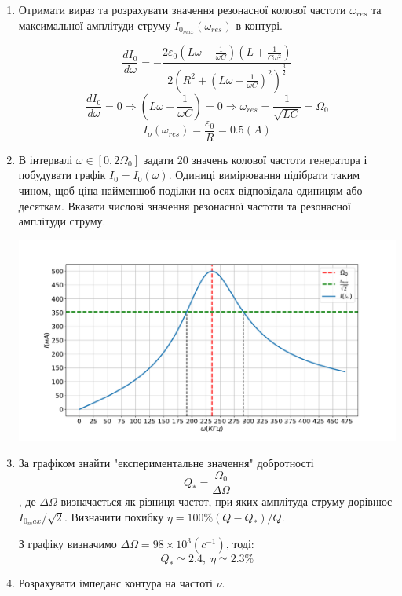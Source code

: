 \documentclass[a4paper, 12pt]{article}
\begin{document}
\begin{enumerate}
    \item Отримати вираз та розрахувати значення резонасної колової частоти 
    $\omega_{res}$ та максимальної амплітуди струму $I_{0_{max}}(\omega_{res})$ в контурі.

    $$ \frac{dI_0}{d\omega} = 
    -\frac{2 \varepsilon_0 \left( L \omega - \frac{1}{\omega C} \right) \left( L + \frac{1}{C \omega^2} \right)}
    { 2\left(R^2 + \left( L \omega - \frac{1}{\omega C} \right)^2 \right)^{\frac{3}{2}} }$$
    $$ \frac{dI_0}{d\omega} = 0 \Rightarrow \left( L \omega - \frac{1}{\omega C} \right) = 0 \Rightarrow 
    \omega_{res} = \frac{1}{\sqrt{LC}} = \Omega_0 $$
    $$ I_o(\omega_{res}) = \frac{\varepsilon_0}{R} = 0.5 (A)$$

    \item В інтервалі $\omega \in \left[ 0,2\Omega_0 \right]$ задати 20
    значень колової частоти генератора і побудувати графік $I_0=I_0(\omega)$.
    Одиниці вимірювання підібрати таким чином, щоб ціна найменшоб поділки на осях
    відповідала одиницям або десяткам. Вказати числові значення резонасної частоти
    та резонасної амплітуди струму.
    
    \includegraphics[width=1.0\textwidth]{graphics/I(w).pdf}

    \item За графіком знайти "експериментальне значення" добротності
    $$Q_* = \frac{\Omega_0}{\Delta \Omega}$$,
    де $\Delta \Omega$ визначається як різниця частот, при яких амплітуда
    струму дорівнює $I_{0_max}/\sqrt{2}$. 
    Визначити похибку $\eta = 100\% \left( Q-Q_* \right) / Q$.
 
    З графіку визначимо $\Delta \Omega = 98 \times 10^3(c^{-1})$, тоді:
    $$ Q_* \simeq 2.4, \; \eta \simeq 2.3 \%$$

    \item Розрахувати імпеданс контура на частоті $\nu$.


\end{enumerate}
\end{document}
